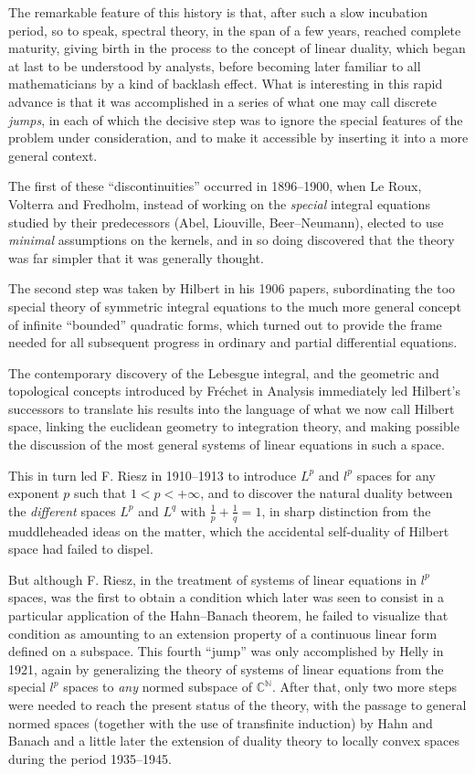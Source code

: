 \documentclass[12pt,a4paper,leqno,twoside]{extbook}
\newcommand{\C}{\mathbb{C}}
\begin{document}
The remarkable feature of this history is that, after such a slow incubation period, so to speak, spectral theory, in the span of a few years, reached complete maturity, giving birth in the process to the concept of linear duality, which began at last to be understood by analysts, before becoming later familiar to all mathematicians by a kind of backlash effect. What is interesting in this rapid advance is that it was accomplished in a series of what one may call discrete \emph{jumps}, in each of which the decisive step was to ignore the special features of the problem under consideration, and to make it accessible by inserting it into a more general context.

The first of these ``discontinuities'' occurred in 1896--1900, when Le Roux, Volterra and Fredholm, instead of working on the \emph{special} integral equations studied by their predecessors (Abel, Liouville, Beer--Neumann), elected to use \emph{minimal} assumptions on the kernels, and in so doing discovered that the theory was far simpler that it was generally thought.

The second step was taken by Hilbert in his 1906 papers, subordinating the too special theory of symmetric integral equations to the much more general concept of infinite ``bounded'' quadratic forms, which turned out to provide the frame needed for all subsequent progress in ordinary and partial differential equations.

The contemporary discovery of the Lebesgue integral, and the geometric and topological concepts introduced by Fréchet in Analysis immediately led Hilbert's successors to translate his results into the language of what we now call Hilbert space, linking the euclidean geometry to integration theory, and making possible the discussion of the most general systems of linear equations in such a space.

This in turn led F. Riesz in 1910--1913 to introduce \(L^p\) and \(l^p\) spaces for any exponent \(p\) such that \(1 < p < +\infty\), and to discover the natural duality between the \emph{different} spaces \(L^p\) and \(L^q\) with \(\frac{1}{p} + \frac{1}{q} = 1\), in sharp distinction from the muddleheaded ideas on the matter, which the accidental self-duality of Hilbert space had failed to dispel.

But although F. Riesz, in the treatment of systems of linear equations in \(l^p\) spaces, was the first to obtain a condition which later was seen to consist in a particular application of the Hahn--Banach theorem, he failed to visualize that condition as amounting to an extension property of a continuous linear form defined on a subspace. This fourth ``jump'' was only accomplished by Helly in 1921, again by generalizing the theory of systems of linear equations from the special \(l^p\) spaces to \emph{any} normed subspace of \(\C^{\mathbb{N}}\). After that, only two more steps were needed to reach the present status of the theory, with the passage to general normed spaces (together with the use of transfinite induction) by Hahn and Banach and a little later the extension of duality theory to locally convex spaces during the period 1935--1945.
\end{document}
